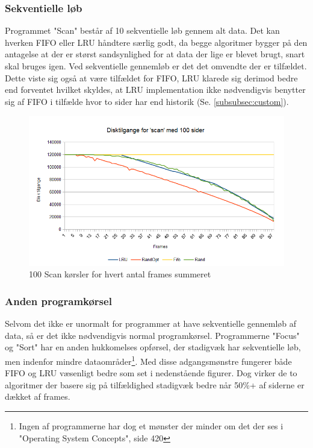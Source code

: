 \subsubsection{Sekventielle løb}
Programmet "Scan" består af 10 sekventielle løb gennem alt data. Det kan hverken FIFO eller LRU håndtere særlig godt, da begge algoritmer bygger på den antagelse at der er størst sandsynlighed for at data der lige er blevet brugt, snart skal bruges igen. Ved sekventielle gennemløb er det det omvendte der er tilfældet. Dette viste sig også at være tilfældet for FIFO, LRU klarede sig derimod bedre end forventet hvilket skyldes, at LRU implementation ikke nødvendigvis benytter sig af FIFO i tilfælde hvor to sider har end historik (Se. \ref{subsubsec:custom}).

\begin{figure}[ht]
\centerline{\includegraphics[scale=0.8]{graph/stat_scan}}
\caption{100 Scan kørsler for hvert antal frames summeret}
\label{fig:scan}
\end{figure}

\subsubsection{Anden programkørsel}
Selvom det ikke er unormalt for programmer at have sekventielle gennemløb af data, så er det ikke nødvendigvis normal programkørsel. Programmerne "Focus" og "Sort" har en anden hukkomelses opførsel, der stadigvæk har sekventielle løb, men indenfor mindre dataområder\footnote{Ingen af programmerne har dog et mønster der minder om det der ses i "Operating System Concepts", side 420}. Med disse adgangsmønstre fungerer både FIFO og LRU væsenligt bedre som set i nedenstående figurer. Dog virker de to algoritmer der basere sig på tilfældighed stadigvæk bedre når 50\%+ af siderne er dækket af frames. 

